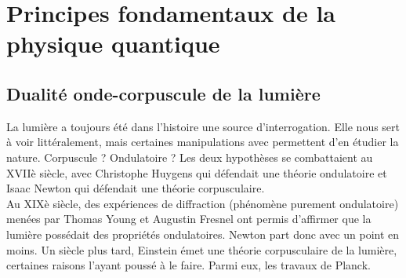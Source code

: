 \documentclass[12pt, a4paper]{book}
\author{Sami \textsc{Abdul Sater}}
\date{\hspace{-0cm}Année académique 2020-2021}
\begin{document}
\maketitle
\vfill


\thispagestyle{empty}
\restoregeometry
\tableofcontents
\chapter{Principes fondamentaux de la physique quantique}

\section{Dualité onde-corpuscule de la lumière}
La lumière a toujours été dans l'histoire une source d'interrogation. Elle nous sert à voir littéralement, mais certaines manipulations avec permettent d'en étudier la nature. Corpuscule ? Ondulatoire ? Les deux hypothèses se combattaient au XVIIè siècle, avec Christophe Huygens qui défendait une théorie ondulatoire et Isaac Newton qui défendait une théorie corpusculaire. \\

Au XIXè siècle, des expériences de diffraction (phénomène purement ondulatoire) menées par Thomas Young et Augustin Fresnel ont permis d'affirmer que la lumière possédait des propriétés ondulatoires. Newton part donc avec un point en moins. Un siècle plus tard, Einstein émet une théorie corpusculaire de la lumière, certaines raisons l'ayant poussé à le faire. Parmi eux, les travaux de Planck. \\
\end{document}
